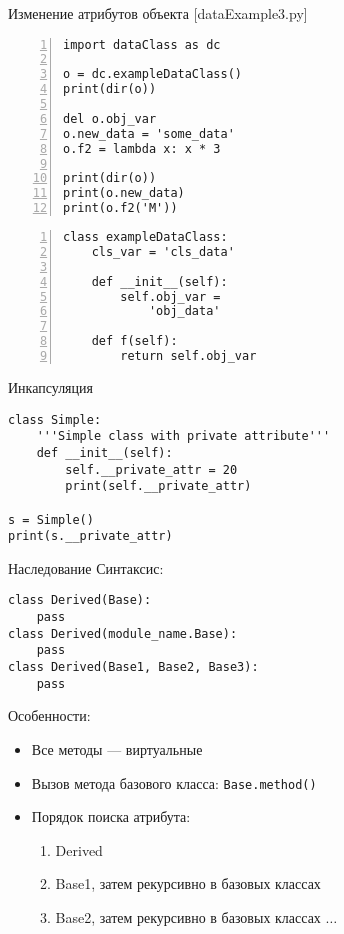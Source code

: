 \documentclass[hyperref={pdftex,unicode}]{beamer}
\begin{document}
\begin{frame}[fragile]{Изменение атрибутов объекта [dataExample3.py]}
\begin{minipage}{0.62\linewidth}
    \begin{lstlisting}[numbers=left,basicstyle=\scriptsize\ttfamily]
import dataClass as dc

o = dc.exampleDataClass()
print(dir(o))

del o.obj_var
o.new_data = 'some_data'
o.f2 = lambda x: x * 3

print(dir(o))
print(o.new_data)
print(o.f2('M'))
    \end{lstlisting}
\end{minipage}
\hfill
\begin{minipage}{0.35\linewidth}
    \begin{lstlisting}[numbers=left,basicstyle=\tiny\ttfamily,numbers=none]
class exampleDataClass:
    cls_var = 'cls_data'

    def __init__(self):
        self.obj_var =
            'obj_data'

    def f(self):
        return self.obj_var
    \end{lstlisting}
\end{minipage}
\end{frame}

\begin{frame}[fragile]{Инкапсуляция}
    \begin{lstlisting}
class Simple:
    '''Simple class with private attribute'''
    def __init__(self):
        self.__private_attr = 20
        print(self.__private_attr)

s = Simple()
print(s.__private_attr)
\end{lstlisting}
\end{frame}

\begin{frame}[fragile]{Наследование}
Синтаксис:
    \begin{lstlisting}[numbers=none]
class Derived(Base):
    pass
class Derived(module_name.Base):
    pass
class Derived(Base1, Base2, Base3):
    pass
    \end{lstlisting}
Особенности:
\begin{itemize}
\item Все методы --- виртуальные
\item Вызов метода базового класса: \lstinline$Base.method()$
\item Порядок поиска атрибута:
  \begin{enumerate}
    \item
      Derived
    \item Base1, затем рекурсивно в базовых классах
    \item Base2, затем рекурсивно в базовых классах $\dots$
  \end{enumerate}
\end{itemize}
\end{frame}
\end{document}
